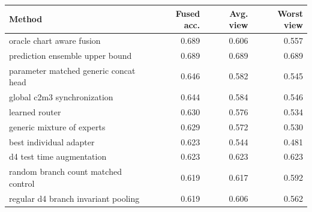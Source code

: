 \begin{tabular}{lrrr}
\toprule
Method & Fused acc. & Avg. view & Worst view\\
\midrule
oracle chart aware fusion & 0.689 & 0.606 & 0.557\\
prediction ensemble upper bound & 0.689 & 0.689 & 0.689\\
parameter matched generic concat head & 0.646 & 0.582 & 0.545\\
global c2m3 synchronization & 0.644 & 0.584 & 0.546\\
learned router & 0.630 & 0.576 & 0.534\\
generic mixture of experts & 0.629 & 0.572 & 0.530\\
best individual adapter & 0.623 & 0.544 & 0.481\\
d4 test time augmentation & 0.623 & 0.623 & 0.623\\
random branch count matched control & 0.619 & 0.617 & 0.592\\
regular d4 branch invariant pooling & 0.619 & 0.606 & 0.562\\
\bottomrule
\end{tabular}
